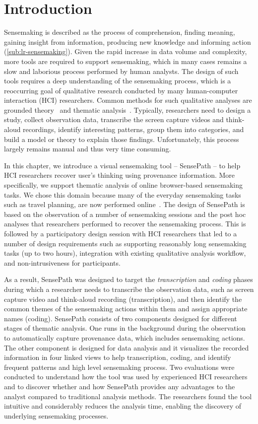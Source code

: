 \section{Introduction}
Sensemaking is described as the process of comprehension, finding meaning, gaining insight from information, producing new knowledge and informing action (\autoref{sub:lr-sensemaking}). Given the rapid increase in data volume and complexity, more tools are required to support sensemaking, which in many cases remains a slow and laborious process performed by human analysts. The design of such tools requires a deep understanding of the sensemaking process, which is a reoccurring goal of qualitative research conducted by many human-computer interaction (HCI) researchers. Common methods for such qualitative analyses are grounded theory~\cite{Corbin1994} and thematic analysis~\cite{Guest2011}. Typically, researchers need to design a study, collect observation data, transcribe the screen capture videos and think-aloud recordings, identify interesting patterns, group them into categories, and build a model or theory to explain those findings. Unfortunately, this process largely remains manual and thus very time consuming.

In this chapter, we introduce a visual sensemaking tool -- SensePath -- to help HCI researchers recover user's thinking using provenance information. More specifically, we support thematic analysis of online browser-based sensemaking tasks. We chose this domain because many of the everyday sensemaking tasks such as travel planning, are now performed online~\cite{Russell2008}. The design of SensePath is based on the observation of a number of sensemaking sessions and the post hoc analyses that researchers performed to recover the sensemaking process. This is followed by a participatory design session with HCI researchers that led to a number of design requirements such as supporting reasonably long sensemaking tasks (up to two hours), integration with existing qualitative analysis workflow, and non-intrusiveness for participants. 

As a result, SensePath was designed to target the \emph{transcription} and \emph{coding} phases during which a researcher needs to transcribe the observation data, such as screen capture video and think-aloud recording (transcription), and then identify the common themes of the sensemaking actions within them and assign appropriate names (coding). SensePath consists of two components designed for different stages of thematic analysis. One runs in the background during the observation to automatically capture provenance data, which includes sensemaking actions. The other component is designed for data analysis and it visualizes the recorded information in four linked views to help transcription, coding, and identify frequent patterns and high level sensemaking process. Two evaluations were conducted to understand how the tool was used by experienced HCI researchers and to discover whether and how SensePath provides any advantages to the analyst compared to traditional analysis methods. The researchers found the tool intuitive and considerably reduces the analysis time, enabling the discovery of underlying sensemaking processes. 

